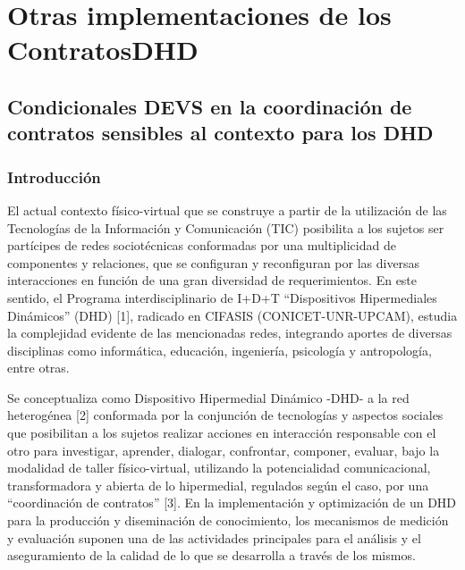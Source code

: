 \chapter{Otras implementaciones de los ContratosDHD} \label{implementaciones}

\section{Condicionales DEVS en la coordinación de contratos sensibles al
contexto para los DHD}

\subsection{Introducción}

El actual contexto físico-virtual que se construye a partir de la utilización de
las Tecnologías de la Información y Comunicación (TIC) posibilita a los sujetos
ser partícipes de redes sociotécnicas conformadas por una multiplicidad de
componentes y relaciones, que se configuran y reconfiguran por las diversas
interacciones en función de una gran diversidad de requerimientos. En este
sentido, el Programa interdisciplinario de I+D+T “Dispositivos Hipermediales
Dinámicos” (DHD) [1], radicado en CIFASIS (CONICET-UNR-UPCAM), estudia la
complejidad evidente de las mencionadas redes, integrando aportes de diversas
disciplinas como informática, educación, ingeniería, psicología y antropología,
entre otras.


Se conceptualiza como Dispositivo Hipermedial Dinámico -DHD- a la red
heterogénea [2] conformada por la conjunción de tecnologías y aspectos sociales
que posibilitan a los sujetos realizar acciones en interacción responsable con
el otro para investigar, aprender, dialogar, confrontar, componer, evaluar, bajo
la modalidad de taller físico-virtual, utilizando la potencialidad
comunicacional, transformadora y abierta de lo hipermedial, regulados según el
caso, por una “coordinación de contratos” [3].
En la implementación y optimización de un DHD para la producción y diseminación
de conocimiento, los mecanismos de medición y evaluación suponen una de las
actividades principales para el análisis y el aseguramiento de la calidad de lo
que se desarrolla a través de los mismos.


